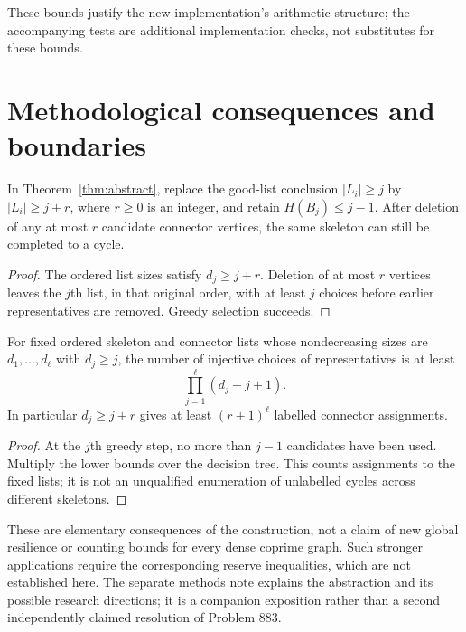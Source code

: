 These bounds justify the new implementation's arithmetic structure; the accompanying tests are additional implementation checks, not substitutes for these bounds.

\section{Methodological consequences and boundaries}\label{app:methodconsequences}
\begin{corollary}
In Theorem~\ref{thm:abstract}, replace the good-list conclusion $|L_i|\ge j$ by $|L_i|\ge j+r$, where $r\ge0$ is an integer, and retain $H(B_j)\le j-1$. After deletion of any at most $r$ candidate connector vertices, the same skeleton can still be completed to a cycle.
\end{corollary}
\begin{proof}
The ordered list sizes satisfy $d_j\ge j+r$. Deletion of at most $r$ vertices leaves the $j$th list, in that original order, with at least $j$ choices before earlier representatives are removed. Greedy selection succeeds.
\end{proof}
\begin{corollary}
For fixed ordered skeleton and connector lists whose nondecreasing sizes are $d_1,\ldots,d_\ell$ with $d_j\ge j$, the number of injective choices of representatives is at least
\[
 \prod_{j=1}^{\ell}(d_j-j+1).
\]
In particular $d_j\ge j+r$ gives at least $(r+1)^\ell$ labelled connector assignments.
\end{corollary}
\begin{proof}
At the $j$th greedy step, no more than $j-1$ candidates have been used. Multiply the lower bounds over the decision tree. This counts assignments to the fixed lists; it is not an unqualified enumeration of unlabelled cycles across different skeletons.
\end{proof}
These are elementary consequences of the construction, not a claim of new global resilience or counting bounds for every dense coprime graph. Such stronger applications require the corresponding reserve inequalities, which are not established here. The separate methods note explains the abstraction and its possible research directions; it is a companion exposition rather than a second independently claimed resolution of Problem 883.
